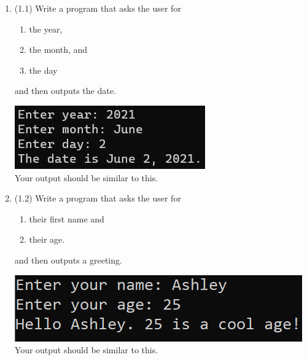 \documentclass{article}
\begin{document}
\begin{enumerate}
\item (1.1) Write a program that asks the user for \\
		\begin{minipage}{0.5\textwidth}	
		\vspace*{-0.5em}
			\begin{enumerate}  \setlength\itemsep{-0.3em}
				\item the year,
				\item the month, and
				\item the day	
			\end{enumerate} \vspace*{-1ex}
		and then outputs the date.
		\end{minipage}
		\begin{minipage}{0.5\textwidth}
			\centering
			\includegraphics[scale=0.75]{./imgs/dateOutput.png}\\
			Your output should be similar to this.
		\end{minipage}

	

\item (1.2) Write a program that asks the user for \\
		\begin{minipage}{0.5\textwidth}
		\vspace*{-0.5em}
			\begin{enumerate}  \setlength\itemsep{-0.3em}
				\item their first name and
				\item their age.  
			\end{enumerate} \vspace*{-1ex}
		and then outputs a greeting.
		\end{minipage}
		\begin{minipage}{0.5\textwidth}
			\centering
			\includegraphics[scale=0.95]{./imgs/outputGreetingWithAge.png}\\
			Your output should be similar to this.
		\end{minipage}





\end{enumerate}
\end{document}
